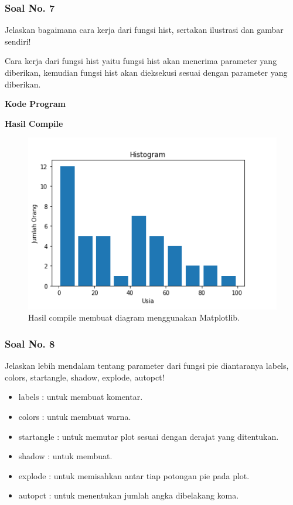 \subsubsection{Soal No. 7}
\hfill \break
Jelaskan bagaimana cara kerja dari fungsi hist, sertakan ilustrasi dan gambar sendiri!

\hfill \break
Cara kerja dari fungsi hist yaitu fungsi hist akan menerima parameter yang diberikan, kemudian fungsi hist akan dieksekusi sesuai dengan parameter yang diberikan.

\hfill \break
\textbf{Kode Program}



\hfill \break
\textbf{Hasil Compile}

\begin{figure}[H]
	\includegraphics[width=12cm]{figures/6/1174026/7.png}
	\centering
	\caption{Hasil compile membuat diagram menggunakan Matplotlib.}
\end{figure}

\subsubsection{Soal No. 8}
\hfill \break
 Jelaskan lebih mendalam tentang parameter dari fungsi pie diantaranya labels, colors, startangle, shadow, explode, autopct!
 
 \begin{itemize}
 	\item labels : untuk membuat komentar.
 	\item colors : untuk membuat warna.
 	\item startangle : untuk memutar plot sesuai dengan derajat yang ditentukan.
 	\item shadow : untuk membuat.
 	\item explode : untuk memisahkan antar tiap potongan pie pada plot.
 	\item autopct : untuk menentukan jumlah angka dibelakang koma.
 \end{itemize}

